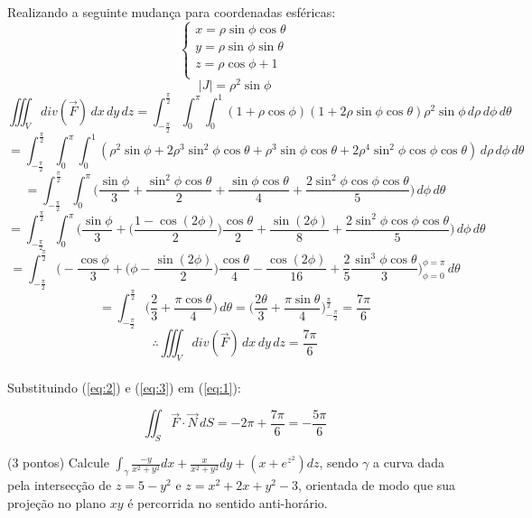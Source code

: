 \documentclass[12pt,a4paper]{article}
\begin{document}
Realizando a seguinte mudança para coordenadas esféricas:
\begin{equation}
\begin{cases}
x = \rho\sin\phi\cos\theta\\
y = \rho\sin\phi\sin\theta\\ 
z = \rho\cos\phi + 1\\
\end{cases}
\label{eq:mudanca}
\end{equation}
$$ |J| = \rho^2 \sin\phi $$
$$ \iiint_{V} div(\vec{F}) \,dx \,dy \,dz = \int_{-\frac{\pi}{2}}^{\frac{\pi}{2}} \int_{0}^{\pi} \int_{0}^{1} (1 + \rho\cos\phi)(1 + 2\rho\sin\phi\cos\theta)\rho^2 \sin\phi \,d\rho \,d\phi \,d\theta $$
$$ =  \int_{-\frac{\pi}{2}}^{\frac{\pi}{2}} \int_{0}^{\pi} \int_{0}^{1} ( \rho^2 \sin\phi + 2 \rho^3\sin^2\phi\cos\theta + \rho^3\sin\phi\cos\theta + 2\rho^4\sin^2\phi\cos\phi\cos\theta )  \,d\rho \,d\phi \,d\theta  $$
$$ =  \int_{-\frac{\pi}{2}}^{\frac{\pi}{2}} \int_{0}^{\pi} \Big(  \frac{\sin\phi}{3} +  \frac{\sin^2\phi\cos\theta}{2} + \frac{\sin\phi\cos\theta}{4} + \frac{2\sin^2\phi\cos\phi\cos\theta}{5} \Big) \,d\phi \,d\theta  $$
$$ =  \int_{-\frac{\pi}{2}}^{\frac{\pi}{2}} \int_{0}^{\pi} \Big(  \frac{\sin\phi}{3} +  \Big( \frac{1 - \cos(2\phi)}{2} \Big) \frac{\cos\theta}{2} + \frac{\sin(2\phi)}{8} + \frac{2\sin^2\phi\cos\phi\cos\theta}{5} \Big) \,d\phi \,d\theta  $$
$$ =  \int_{-\frac{\pi}{2}}^{\frac{\pi}{2}} \Big( - \frac{\cos\phi}{3} +  \Big( \phi - \frac{ \sin(2\phi)}{2} \Big) \frac{\cos\theta}{4} - \frac{\cos(2\phi)}{16} + \frac{2}{5} \frac{\sin^3\phi\cos\theta}{3} \Big)_{\phi=0}^{\phi=\pi}  \,d\theta $$
$$ =  \int_{-\frac{\pi}{2}}^{\frac{\pi}{2}} \Big(  \frac{2}{3} +  \frac{\pi\cos\theta}{4}  \Big) \,d\theta =  \Big(  \frac{2\theta}{3} +  \frac{\pi\sin\theta}{4}  \Big)_{-\frac{\pi}{2}}^{\frac{\pi}{2}} = \frac{7\pi}{6} $$
\begin{equation}
\therefore \iiint_{V} div(\vec{F}) \,dx \,dy \,dz = \frac{7\pi}{6}
\label{eq:3}
\end{equation} \\

Substituindo (\ref{eq:2}) e (\ref{eq:3}) em (\ref{eq:1}):

$$ \iint_{S} \vec{F} \cdot \vec{N} \,dS = -2\pi + \frac{7\pi}{6} = -\frac{5\pi}{6}  $$
 
\newpage

 (3 pontos) Calcule $\displaystyle\int_{\gamma} \frac{-y}{x^2 + y^2}dx + \frac{x}{x^2 + y^2}dy + (x + e^{z^2})dz$, sendo $\gamma$ a curva dada pela intersecção de $z = 5 - y^2$ e $z = x^2 + 2x + y^2 -3$, orientada de modo que sua projeção no plano $xy$ é percorrida no sentido anti-horário.
\end{document}
